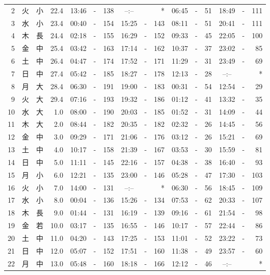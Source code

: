 \documentclass[12pt.a4j]{jsarticle}
\begin{document}
\begin{center}
\begin{table}[ht]
\begin{tabular}{|rc|cr|ccrccr|ccrccr|}
 2 & 火 & 小 & 22.4 & 13:46 &-& 138 & --:-- & &  *  & 06:45 &-&  51 & 18:49 &-& 111 \\
 3 & 水 & 小 & 23.4 & 00:40 &-& 154 & 15:25 &-& 143 & 08:11 &-&  51 & 20:41 &-& 111 \\
 4 & 木 & 長 & 24.4 & 02:18 &-& 155 & 16:29 &-& 152 & 09:33 &-&  45 & 22:05 &-& 100 \\
 5 & 金 & 中 & 25.4 & 03:42 &-& 163 & 17:14 &-& 162 & 10:37 &-&  37 & 23:02 &-&  85 \\
 6 & 土 & 中 & 26.4 & 04:47 &-& 174 & 17:52 &-& 171 & 11:29 &-&  31 & 23:49 &-&  69 \\
 7 & 日 & 中 & 27.4 & 05:42 &-& 185 & 18:27 &-& 178 & 12:13 &-&  28 & --:-- & &  *  \\
 8 & 月 & 大 & 28.4 & 06:30 &-& 191 & 19:00 &-& 183 & 00:31 &-&  54 & 12:54 &-&  29 \\
 9 & 火 & 大 & 29.4 & 07:16 &-& 193 & 19:32 &-& 186 & 01:12 &-&  41 & 13:32 &-&  35 \\
10 & 水 & 大 &  1.0 & 08:00 &-& 190 & 20:03 &-& 185 & 01:52 &-&  31 & 14:09 &-&  44 \\
11 & 木 & 大 &  2.0 & 08:44 &-& 182 & 20:35 &-& 182 & 02:32 &-&  26 & 14:45 &-&  56 \\
12 & 金 & 中 &  3.0 & 09:29 &-& 171 & 21:06 &-& 176 & 03:12 &-&  26 & 15:21 &-&  69 \\
13 & 土 & 中 &  4.0 & 10:17 &-& 158 & 21:39 &-& 167 & 03:53 &-&  30 & 15:59 &-&  81 \\
14 & 日 & 中 &  5.0 & 11:11 &-& 145 & 22:16 &-& 157 & 04:38 &-&  38 & 16:40 &-&  93 \\
15 & 月 & 小 &  6.0 & 12:21 &-& 135 & 23:00 &-& 146 & 05:28 &-&  47 & 17:30 &-& 103 \\
16 & 火 & 小 &  7.0 & 14:00 &-& 131 & --:-- & &  *  & 06:30 &-&  56 & 18:45 &-& 109 \\
17 & 水 & 小 &  8.0 & 00:04 &-& 136 & 15:26 &-& 134 & 07:53 &-&  62 & 20:33 &-& 107 \\
18 & 木 & 長 &  9.0 & 01:44 &-& 131 & 16:19 &-& 139 & 09:16 &-&  61 & 21:54 &-&  98 \\
19 & 金 & 若 & 10.0 & 03:17 &-& 135 & 16:55 &-& 146 & 10:17 &-&  57 & 22:44 &-&  86 \\
20 & 土 & 中 & 11.0 & 04:20 &-& 143 & 17:25 &-& 153 & 11:01 &-&  52 & 23:22 &-&  73 \\
21 & 日 & 中 & 12.0 & 05:07 &-& 152 & 17:51 &-& 160 & 11:38 &-&  49 & 23:57 &-&  60 \\
22 & 月 & 中 & 13.0 & 05:48 &-& 160 & 18:18 &-& 166 & 12:12 &-&  46 & --:-- & &  *  \\

\end{tabular}
\end{table}
\end{center}
\end{document}
